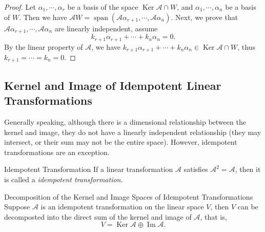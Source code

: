 \begin{proof}
  Let $\alpha_1,\cdots,\alpha_r$ be a basis of the space $\operatorname{Ker}
  \mathcal{A} \cap W$,
  and $\alpha_1,\cdots,\alpha_n$ be a basis of $W$.
  Then we have $\mathcal{A}W = \operatorname{span} (\mathcal{A}\alpha_{r+1},\cdots,\mathcal{A}\alpha_n)$.
  Next, we prove that $\mathcal{A}\alpha_{r+1},\cdots,\mathcal{A}\alpha_n$ are
  linearly independent, assume
  \begin{equation}
    k_{r+1}\alpha_{r+1} + \cdots + k_n \alpha_n = 0.
  \end{equation}
  By the linear property of $\mathcal{A}$,
  we have $k_{r+1}\alpha_{r+1} + \cdots + k_n\alpha_n \in
  \operatorname{Ker}\mathcal{A} \cap W$,
  thus $k_{r+1} = \cdots = k_n = 0$.
\end{proof}

\subsection{Kernel and Image of Idempotent Linear Transformations}

Generally speaking, although there is a dimensional relationship between the
kernel and image, they do not have a linearly independent relationship
(they may intersect, or their sum may not be the entire space).
However, idempotent transformations are an exception.

\begin{definition}{Idempotent Transformation}{}
  If a linear transformation $\mathcal{A}$ satisfies $\mathcal{A}^2 =
  \mathcal{A}$,
  then it is called a \emph{idempotent transformation}.
\end{definition}

\begin{theorem}{Decomposition of the Kernel and Image Spaces of Idempotent Transformations}{}
  Suppose $\mathcal{A}$ is an idempotent transformation on the linear space $V$,
  then $V$ can be decomposted into the direct sum of the kernel and image of
  $\mathcal{A}$,
  that is,
  \begin{equation}
    V = \operatorname{Ker} \mathcal{A} \oplus \operatorname{Im} \mathcal{A}.
  \end{equation}
\end{theorem}

